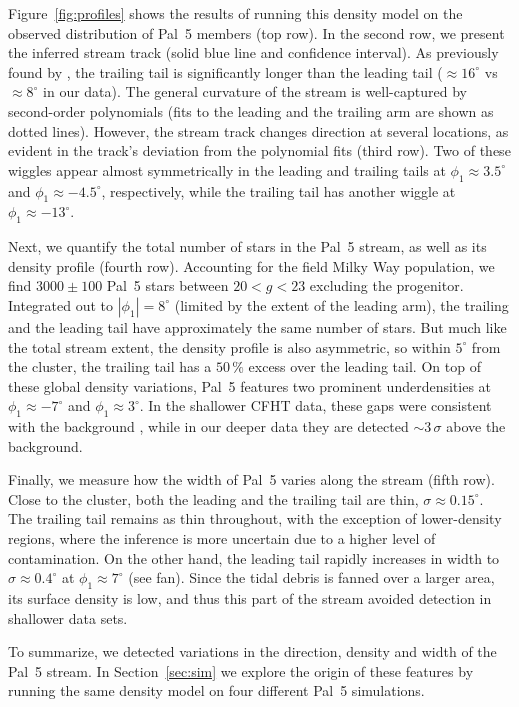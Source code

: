 \documentclass[twocolumn]{aastex62}
\begin{document}
Figure~\ref{fig:profiles} shows the results of running this density model on the observed distribution of Pal~5 members (top row).
In the second row, we present the inferred stream track (solid blue line and confidence interval).
As previously found by \citet{Bernard:2016}, the trailing tail is significantly longer than the leading tail ($\approx16^\circ$ vs $\approx8^\circ$ in our data). 
The general curvature of the stream is well-captured by second-order polynomials (fits to the leading and the trailing arm are shown as dotted lines).
However, the stream track changes direction at several locations, as evident in the track's deviation from the polynomial fits (third row).
Two of these wiggles appear almost symmetrically in the leading and trailing tails at $\phi_1\approx3.5^\circ$ and $\phi_1\approx-4.5^\circ$, respectively, while the trailing tail has another wiggle at $\phi_1\approx-13^\circ$.

Next, we quantify the total number of stars in the Pal~5 stream, as well as its density profile (fourth row).
Accounting for the field Milky Way population, we find $3000\pm100$ Pal~5 stars between $20<g<23$ excluding the progenitor.
Integrated out to $|\phi_1|=8^\circ$ (limited by the extent of the leading arm), the trailing and the leading tail have approximately the same number of stars.
But much like the total stream extent, the density profile is also asymmetric, so within $5^\circ$ from the cluster, the trailing tail has a $50\,\%$ excess over the leading tail.
On top of these global density variations, Pal~5 features two prominent underdensities at $\phi_1\approx-7^\circ$ and $\phi_1\approx3^\circ$.
In the shallower CFHT data, these gaps were consistent with the background \citep{Erkal:2016}, while in our deeper data they are detected $\sim3\,\sigma$ above the background.

Finally, we measure how the width of Pal~5 varies along the stream (fifth row).
Close to the cluster, both the leading and the trailing tail are thin, $\sigma\approx0.15^\circ$.
The trailing tail remains as thin throughout, with the exception of lower-density regions, where the inference is more uncertain due to a higher level of contamination.
On the other hand, the leading tail rapidly increases in width to $\sigma\approx0.4^\circ$ at $\phi_1\approx7^\circ$ (see fan).
Since the tidal debris is fanned over a larger area, its surface density is low, and thus this part of the stream avoided detection in shallower data sets.

To summarize, we detected variations in the direction, density and width of the Pal~5 stream.
In Section~\ref{sec:sim} we explore the origin of these features by running the same density model on four different Pal~5 simulations.
\end{document}
